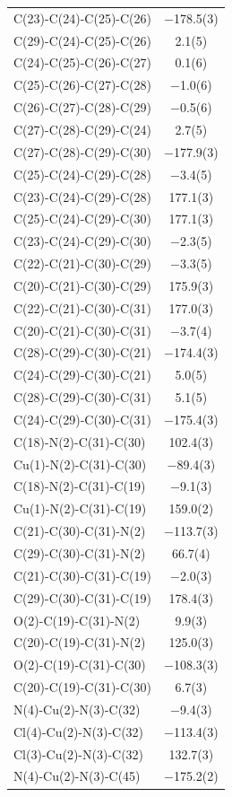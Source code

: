 \begin{center}
{\begin{supertabular}{p{1.8in}c}
C(23)-C(24)-C(25)-C(26)&$-$178.5(3)\\
C(29)-C(24)-C(25)-C(26)&2.1(5)\\
C(24)-C(25)-C(26)-C(27)&0.1(6)\\
C(25)-C(26)-C(27)-C(28)&$-$1.0(6)\\
C(26)-C(27)-C(28)-C(29)&$-$0.5(6)\\
C(27)-C(28)-C(29)-C(24)&2.7(5)\\
C(27)-C(28)-C(29)-C(30)&$-$177.9(3)\\
C(25)-C(24)-C(29)-C(28)&$-$3.4(5)\\
C(23)-C(24)-C(29)-C(28)&177.1(3)\\
C(25)-C(24)-C(29)-C(30)&177.1(3)\\
C(23)-C(24)-C(29)-C(30)&$-$2.3(5)\\
C(22)-C(21)-C(30)-C(29)&$-$3.3(5)\\
C(20)-C(21)-C(30)-C(29)&175.9(3)\\
C(22)-C(21)-C(30)-C(31)&177.0(3)\\
C(20)-C(21)-C(30)-C(31)&$-$3.7(4)\\
C(28)-C(29)-C(30)-C(21)&$-$174.4(3)\\
C(24)-C(29)-C(30)-C(21)&5.0(5)\\
C(28)-C(29)-C(30)-C(31)&5.1(5)\\
C(24)-C(29)-C(30)-C(31)&$-$175.4(3)\\
C(18)-N(2)-C(31)-C(30)&102.4(3)\\
Cu(1)-N(2)-C(31)-C(30)&$-$89.4(3)\\
C(18)-N(2)-C(31)-C(19)&$-$9.1(3)\\
Cu(1)-N(2)-C(31)-C(19)&159.0(2)\\
C(21)-C(30)-C(31)-N(2)&$-$113.7(3)\\
C(29)-C(30)-C(31)-N(2)&66.7(4)\\
C(21)-C(30)-C(31)-C(19)&$-$2.0(3)\\
C(29)-C(30)-C(31)-C(19)&178.4(3)\\
O(2)-C(19)-C(31)-N(2)&9.9(3)\\
C(20)-C(19)-C(31)-N(2)&125.0(3)\\
O(2)-C(19)-C(31)-C(30)&$-$108.3(3)\\
C(20)-C(19)-C(31)-C(30)&6.7(3)\\
N(4)-Cu(2)-N(3)-C(32)&$-$9.4(3)\\
Cl(4)-Cu(2)-N(3)-C(32)&$-$113.4(3)\\
Cl(3)-Cu(2)-N(3)-C(32)&132.7(3)\\
N(4)-Cu(2)-N(3)-C(45)&$-$175.2(2)\\

\end{supertabular}}
\end{center}
